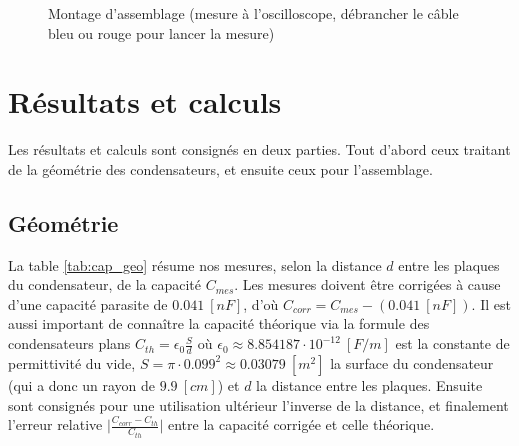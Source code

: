 \documentclass[11pt]{article}
\begin{document}
\begin{figure}[H]
\centering
{}\hfill  
{}\hfill
\caption{Montage d'assemblage (mesure à l'oscilloscope, débrancher le câble bleu ou rouge pour lancer la mesure)}
\label{fig:exp-schem2}
\end{figure}

\section{Résultats et calculs}

Les résultats et calculs sont consignés en deux parties. Tout d'abord ceux traitant de la géométrie des condensateurs, et ensuite ceux pour l'assemblage.

\subsection*{Géométrie}

La table \ref{tab:cap_geo} résume nos mesures, selon la distance $d$ entre les plaques du condensateur, de la capacité $C_{mes}$. Les mesures doivent être corrigées à cause d'une capacité parasite de $0.041 \ [nF]$, d'où $C_{corr} = C_{mes} - (0.041 \ [nF])$. Il est aussi important de connaître la capacité théorique via la formule des condensateurs plans $C_{th} = \epsilon_0 \frac{S}{d} $ où $\epsilon_0 \approx 8.854187 \cdot 10^{-12} \ [F/m]$ est la constante de permittivité du vide, $S = \pi \cdot 0.099^2 \approx 0.03079 \ [m^2]$ la surface du condensateur (qui a donc un rayon de $9.9 \ [cm]$) et $d$ la distance entre les plaques. Ensuite sont consignés pour une utilisation ultérieur l'inverse de la distance, et finalement l'erreur relative $\vert \frac{C_{corr} - C_{th}}{C_{th}} \vert$ entre la capacité corrigée et celle théorique.
\end{document}
